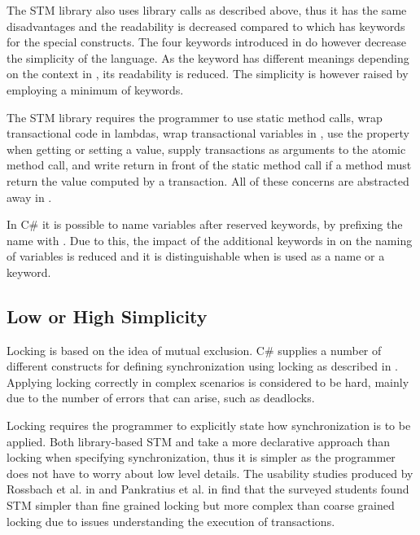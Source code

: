 The \ac{STM} library also uses library calls as described above, thus it has the same disadvantages and the readability is decreased compared to \stmname which has keywords for the special constructs. The four keywords introduced in \stmname do however decrease the simplicity of the language. As the  keyword has different meanings depending on the context in \stmname, its readability is reduced. The simplicity is however raised by employing a minimum of keywords.

The \ac{STM} library requires the programmer to use static method calls, wrap transactional code in lambdas, wrap transactional variables in , use the  property when getting or setting a value, supply  transactions as arguments to the atomic method call, and write return in front of the static method call if a method must return the value computed by a transaction. All of these concerns are abstracted away in \stmname.

In C\# it is possible to name variables after reserved keywords, by prefixing the name with . Due to this, the impact of the additional keywords in \stmname on the naming of variables is reduced and it is distinguishable when  is used as a name or a keyword.

\subsection{Low or High Simplicity}\label{subsec:simplicity}
Locking is based on the idea of mutual exclusion. C\# supplies a number of different constructs for defining synchronization using locking as described in . Applying locking correctly in complex scenarios is considered to be hard\cite[p. 56]{sutter2005software}, mainly due to the number of errors that can arise, such as deadlocks.

Locking requires the programmer to explicitly state how synchronization is to be applied. Both library-based \ac{STM} and \stmname take a more declarative approach than locking when specifying synchronization, thus it is simpler as the programmer does not have to worry about low level details. The usability studies produced by Rossbach et al. in \cite{rossbach2010transactional} and Pankratius et al. in \cite{pankratius2009does} find that the surveyed students found \ac{STM} simpler than fine grained locking but more complex than coarse grained locking due to issues understanding the execution of transactions. 


